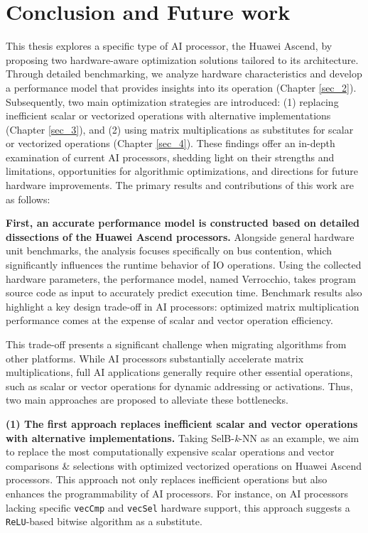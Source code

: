 \chapter{Conclusion and Future work}
\label{sec_5}

This thesis explores a specific type of AI processor, the Huawei Ascend, by proposing two hardware-aware optimization solutions tailored to its architecture. Through detailed benchmarking, we analyze hardware characteristics and develop a performance model that provides insights into its operation (Chapter \ref{sec_2}). Subsequently, two main optimization strategies are introduced: (1) replacing inefficient scalar or vectorized operations with alternative implementations (Chapter \ref{sec_3}), and (2) using matrix multiplications as substitutes for scalar or vectorized operations (Chapter \ref{sec_4}). These findings offer an in-depth examination of current AI processors, shedding light on their strengths and limitations, opportunities for algorithmic optimizations, and directions for future hardware improvements. The primary results and contributions of this work are as follows:

\textbf{First, an accurate performance model is constructed based on detailed dissections of the Huawei Ascend processors.}
Alongside general hardware unit benchmarks, the analysis focuses specifically on bus contention, which significantly influences the runtime behavior of IO operations. Using the collected hardware parameters, the performance model, named Verrocchio, takes program source code as input to accurately predict execution time. Benchmark results also highlight a key design trade-off in AI processors: optimized matrix multiplication performance comes at the expense of scalar and vector operation efficiency.

This trade-off presents a significant challenge when migrating algorithms from other platforms. While AI processors substantially accelerate matrix multiplications, full AI applications generally require other essential operations, such as scalar or vector operations for dynamic addressing or activations. Thus, two main approaches are proposed to alleviate these bottlenecks.

\textbf{(1) The first approach replaces inefficient scalar and vector operations with alternative implementations.}
Taking SelB-\textit{k}-NN as an example, we aim to replace the most computationally expensive scalar operations and vector comparisons \& selections with optimized vectorized operations on Huawei Ascend processors. This approach not only replaces inefficient operations but also enhances the programmability of AI processors. For instance, on AI processors lacking specific \verb|vecCmp| and \verb|vecSel| hardware support, this approach suggests a \verb|ReLU|-based bitwise algorithm as a substitute.

